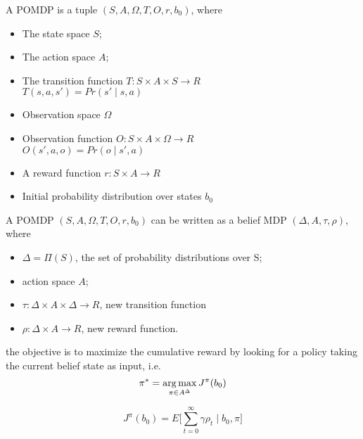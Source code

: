 \begin{definition}
	A POMDP is a tuple $(S, A, \Omega, T, O, r, b_0)$, where
	\begin{itemize}
		\item The state space $S$;
		\item The action space $A$;
		\item The transition function $T:S\times A \times S \to R$\\
			$T(s,a,s')=Pr(s'\mid s,a)$
		\item Observation space $\Omega$
		\item Observation function $O:S\times A \times \Omega \to R$\\
		$O(s',a,o)= Pr(o\mid s',a)$
		\item A reward function $r: S \times A \to R$
		\item Initial probability distribution over states $b_0$
	\end{itemize}
\end{definition}



\begin{definition}
	A POMDP $(S, A, \Omega, T, O, r, b_0)$ can be written as a belief MDP $(\Delta, A, \tau, \rho)$, where
	\begin{itemize}
		\item $\Delta = \Pi(S)$, the set of probability distributions over S;
		\item action space $A$;
		\item $\tau : \Delta \times A \times \Delta \to R$, new transition function
		\item $\rho: \Delta \times A \to R$, new reward function.
	\end{itemize}
\end{definition}


the objective is to maximize the cumulative reward by looking for a policy taking the current belief state as input, i.e.
\begin{equation}
	\pi^* = \operatorname*{arg\,max}_{\pi\in A^\Delta} J^\pi(b_0)
\end{equation}




\begin{equation}
	J^\pi(b_0)=E \big[\sum_{t=0}^{\infty}\gamma \rho_t\mid b_0,\pi\big]
\end{equation}




